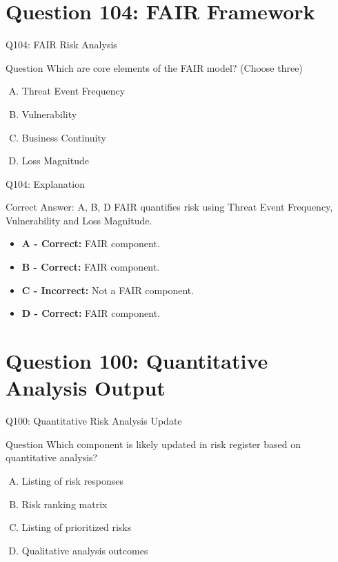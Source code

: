 \documentclass{beamer}
\begin{document}
	\section{Question 104: FAIR Framework}
	
	\begin{frame}{Q104: FAIR Risk Analysis}
		\begin{block}{Question}
			Which are core elements of the FAIR model?
			(Choose three)
		\end{block}
		
		\begin{enumerate}[(A)]
			\item Threat Event Frequency
			\item Vulnerability
			\item Business Continuity
			\item Loss Magnitude
		\end{enumerate}
	\end{frame}
	
	\begin{frame}{Q104: Explanation}
		\begin{block}{Correct Answer: A, B, D}
			FAIR quantifies risk using Threat Event Frequency,
			Vulnerability and Loss Magnitude.
		\end{block}
		
		\begin{itemize}
			\item \textbf{A - Correct:} FAIR component.
			\item \textbf{B - Correct:} FAIR component.
			\item \textbf{C - Incorrect:} Not a FAIR component.
			\item \textbf{D - Correct:} FAIR component.
		\end{itemize}
	\end{frame}
	
	\section{Question 100: Quantitative Analysis Output}
	
	\begin{frame}{Q100: Quantitative Risk Analysis Update}
		\begin{block}{Question}
			Which component is likely updated in risk register based on quantitative analysis?
		\end{block}
		\begin{enumerate}[(A)]
			\item Listing of risk responses
			\item Risk ranking matrix
			\item Listing of prioritized risks
			\item Qualitative analysis outcomes
		\end{enumerate}
	\end{frame}
	
\end{document}
